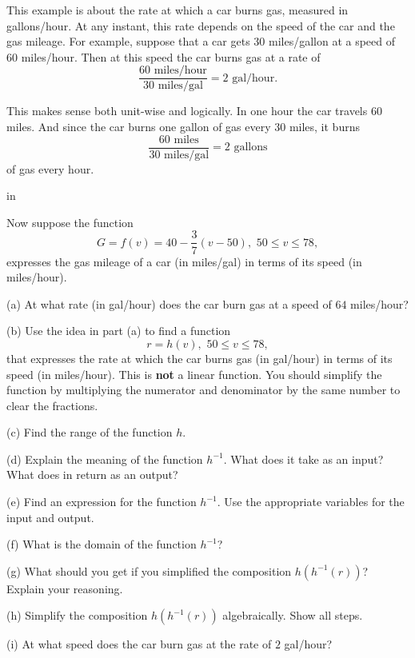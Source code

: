 \documentclass{ximera}
\newcommand{\pskip}{\vskip 0.1 in}
\begin{document}
\begin{example} \label{Ex4:Inverses}
This example is about the rate at which a car burns gas, measured in gallons/hour. At any instant, this rate depends on the speed of the car and the gas mileage. For example, suppose that a car gets 30 miles/gallon at a speed of 60 miles/hour. Then at this speed the car burns gas at a rate of
\[
     \frac{60 \text{ miles/hour}}{30 \text{ miles/gal}} = 2 \text{ gal/hour}.
\]

This makes sense both unit-wise and logically. In one hour the car travels 60 miles. And since the car burns one gallon of gas every 30 miles, it burns
\[
    \frac{60 \text{ miles}}{30 \text{ miles/gal}} = 2 \text{ gallons}
\]
of gas every hour.

\pskip

Now suppose the function 
\[
    G = f(v) = 40-\frac{3}{7}(v-50) ,  \,\, 50\leq v \leq 78 ,
\]
expresses the gas mileage of a car (in miles/gal) in terms of its speed (in miles/hour).

(a) At what rate (in gal/hour) does the car burn gas at a speed of $64$ miles/hour?

(b) Use the idea in part (a) to find a function 
\[
     r=h(v) , \,\, 50\leq v \leq 78 ,
\]
that expresses the rate at which the car burns gas (in gal/hour) in terms of its speed (in miles/hour). This is {\bf not} a linear function. You should simplify the function by multiplying the numerator and denominator by the same number to clear the fractions. %

(c) Find the range of the function $h$.

(d) Explain the meaning of the function $h^{-1}$. What does it take as an input? What does in return as an output?

(e) Find an expression for the function $h^{-1}$. Use the appropriate variables for the input and output.

(f) What is the domain of the function $h^{-1}$?

(g) What should you get if you simplified the composition $h(h^{-1}(r))$? Explain your reasoning.

(h) Simplify the composition $h(h^{-1}(r))$ algebraically. Show all steps.

(i) At what speed does the car burn gas at the rate of $2$ gal/hour?

\end{example}
\end{document}
